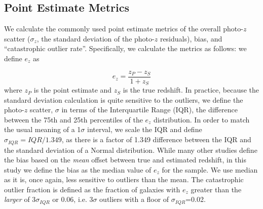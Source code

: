 \subsection{Point Estimate Metrics}
\label{sec:point_metrics}
We calculate the commonly used point estimate metrics of the overall photo-$z$ scatter ($\sigma_{z}$, the standard deviation of the photo-$z$ residuals), bias, and ``catastrophic outlier rate''.  Specifically, we calculate the metrics as follows:
we define $e_{z}$ as

\begin{equation}
e_{z} = \frac{z_{P} -z_{S}}{1+z_{S}}
\end{equation}
where $z_{P}$ is the point estimate and $z_{S}$ is the true redshift.
In practice, because the standard deviation calculation is quite sensitive to the outliers, we define the photo-$z$ scatter, $\sigma$ in terms of the Interquartile Range (IQR), the difference between the 75th and 25th percentiles of the $e_{z}$ distribution.  In order to match the usual meaning of a 1$\sigma$ interval, we scale the IQR and define $\sigma_{IQR} = IQR/1.349$, as there is a factor of 1.349 difference between the IQR and the standard deviation of a Normal distribution.
While many other studies define the bias based on the {\it mean} offset between true and estimated redshift, in this study we define the bias as the median value of $e_{z}$ for the sample.  We use median as it is, once again, less sensitive to outliers than the mean.  The catastrophic outlier fraction is defined as the fraction of galaxies with $e_{z}$ greater than the {\it larger} of $3\sigma_{IQR}$ or 0.06, i.e. 3$\sigma$ outliers with a floor of $\sigma_{IQR}$=0.02.
